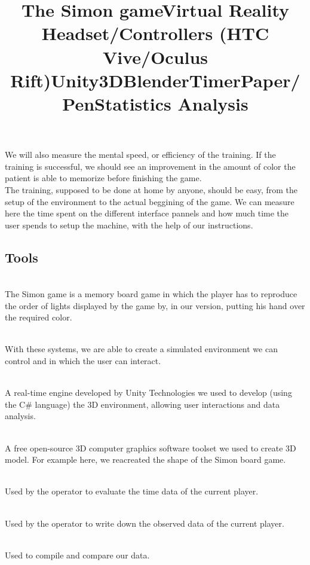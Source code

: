 \documentclass[12pt, openany, twocolumn]{article}
\begin{document}
    We will also measure the mental speed, or efficiency of the training. 
    If the training is successful, we should see an improvement in the amount of color the patient is able to memorize before finishing the game.
    \\

    The training, supposed to be done at home by anyone, should be easy, from the setup of the environment to the actual beggining of the game. 
    We can measure here the time spent on the different interface pannels and how much time the user spends to setup the machine, with the help of our instructions.

    \subsection{Tools}
        \title{\textbf{The Simon game}} \\
    The Simon game is a memory board game in which the player has to reproduce the order of lights displayed by the game by, in our version, putting his hand over the required color. \\

        \noindent \title{\textbf{Virtual Reality Headset/Controllers (HTC Vive/Oculus Rift)}} \\
    With these systems, we are able to create a simulated environment we can control and in which the user can interact. \\
    
        \noindent \title{\textbf{Unity3D}} \\
    A real-time engine developed by Unity Technologies we used to develop (using the C\# language) the 3D environment, allowing user interactions and data analysis. \\

        \noindent \title{\textbf{Blender}} \\
    A free open-source 3D computer graphics software toolset we used to create 3D model. For example here, we reacreated the shape of the Simon board game. \\   
        
        \noindent \title{\textbf{Timer}} \\
    Used by the operator to evaluate the time data of the current player. \\

        \noindent \title{\textbf{Paper/Pen}} \\
    Used by the operator to write down the observed data of the current player. \\
    
        \noindent \title{\textbf{Statistics Analysis}} \\
    Used to compile and compare our data.



\end{document}
